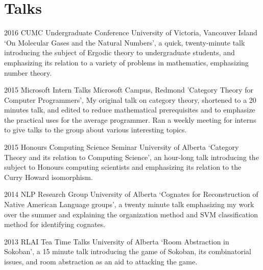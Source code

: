 \documentclass{friggeri-cv} %
\begin{document}

\pagebreak[3]
\section{Talks} %

\begin{entrylist}


\entry
{2016}
{CUMC Undergraduate Conference}
{University of Victoria, Vancouver Island}
{`On Molecular Gases and the Natural Numbers', a quick, twenty-minute talk introducing the subject of Ergodic theory to undergraduate students, and emphasizing its relation to a variety of problems in mathematics, emphasizing number theory.}


\entry
{2015}
{Microsoft Intern Talks}
{Microsoft Campus, Redmond}
{'Category Theory for Computer Programmers', My original talk on category theory, shortened to a 20 minutes talk, and edited to reduce mathematical prerequisites and to emphasize the practical uses for the average programmer. Ran a weekly meeting for interns to give talks to the group about various interesting topics.}


\entry
{2015}
{Honours Computing Science Seminar}
{University of Alberta}
{`Category Theory and its relation to Computing Science', an hour-long talk introducing the subject to Honours computing scientists and emphasizing its relation to the Curry Howard isomorphism.}


\entry
{2014}
{NLP Research Group}
{University of Alberta}
{`Cognates for Reconstruction of Native American Language groups', a twenty minute talk emphasizing my work over the summer and explaining the organization method and SVM classification method for identifying cognates.}


\entry
{2013}
{RLAI Tea Time Talks}
{University of Alberta}
{`Room Abstraction in Sokoban', a 15 minute talk introducing the game of Sokoban, its combinatorial issues, and room abstraction as an aid to attacking the game.}

\end{entrylist}
\end{document}
